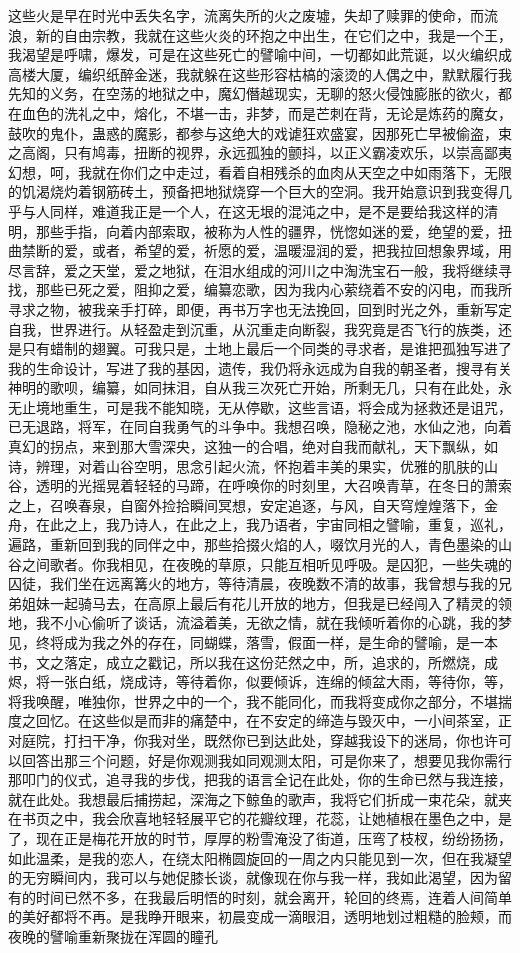 \documentclass[UTF8]{article}
\begin{document}
这些火是早在时光中丢失名字，流离失所的火之废墟，失却了赎罪的使命，而流浪，新的自由宗教，我就在这些火炎的环抱之中出生，在它们之中，我是一个王，我渴望是呼啸，爆发，可是在这些死亡的譬喻中间，一切都如此荒诞，以火编织成高楼大厦，编织纸醉金迷，我就躲在这些形容枯槁的滚烫的人偶之中，默默履行我先知的义务，在空荡的地狱之中，魔幻僭越现实，无聊的怒火侵蚀膨胀的欲火，都在血色的洗礼之中，熔化，不堪一击，非梦，而是芒刺在背，无论是炼药的魔女，鼓吹的鬼仆，蛊惑的魔影，都参与这绝大的戏谑狂欢盛宴，因那死亡早被偷盗，束之高阁，只有鸠毒，扭断的视界，永远孤独的颤抖，以正义霸凌欢乐，以崇高鄙夷幻想，呵，我就在你们之中走过，看着自相残杀的血肉从天空之中如雨落下，无限的饥渴烧灼着钢筋砖土，预备把地狱烧穿一个巨大的空洞。我开始意识到我变得几乎与人同样，难道我正是一个人，在这无垠的混沌之中，是不是要给我这样的清明，那些手指，向着内部索取，被称为人性的疆界，恍惚如迷的爱，绝望的爱，扭曲禁断的爱，或者，希望的爱，祈愿的爱，温暖湿润的爱，把我拉回想象界域，用尽言辞，爱之天堂，爱之地狱，在泪水组成的河川之中淘洗宝石一般，我将继续寻找，那些已死之爱，阻抑之爱，编纂恋歌，因为我内心萦绕着不安的闪电，而我所寻求之物，被我亲手打碎，即便，再书万字也无法挽回，回到时光之外，重新写定自我，世界进行。从轻盈走到沉重，从沉重走向断裂，我究竟是否飞行的族类，还是只有蜡制的翅翼。可我只是，土地上最后一个同类的寻求者，是谁把孤独写进了我的生命设计，写进了我的基因，遗传，我仍将永远成为自我的朝圣者，搜寻有关神明的歌呗，编纂，如同抹泪，自从我三次死亡开始，所剩无几，只有在此处，永无止境地重生，可是我不能知晓，无从停歇，这些言语，将会成为拯救还是诅咒，已无退路，将军，在同自我勇气的斗争中。我想召唤，隐秘之池，水仙之池，向着真幻的拐点，来到那大雪深央，这独一的合唱，绝对自我而献礼，天下飘纵，如诗，辨理，对着山谷空明，思念引起火流，怀抱着丰美的果实，优雅的肌肤的山谷，透明的光摇晃着轻轻的马蹄，在呼唤你的时刻里，大召唤青草，在冬日的萧索之上，召唤春泉，自窗外捡拾瞬间冥想，安定追逐，与风，自天穹煌煌落下，金舟，在此之上，我乃诗人，在此之上，我乃语者，宇宙同相之譬喻，重复，巡礼，遍路，重新回到我的同伴之中，那些拾掇火焰的人，啜饮月光的人，青色墨染的山谷之间歌者。你我相见，在夜晚的草原，只能互相听见呼吸。是囚犯，一些失魂的囚徒，我们坐在远离篝火的地方，等待清晨，夜晚数不清的故事，我曾想与我的兄弟姐妹一起骑马去，在高原上最后有花儿开放的地方，但我是已经闯入了精灵的领地，我不小心偷听了谈话，流溢着美，无欲之情，就在我倾听着你的心跳，我的梦见，终将成为我之外的存在，同蝴蝶，落雪，假面一样，是生命的譬喻，是一本书，文之落定，成立之戳记，所以我在这份茫然之中，所，追求的，所燃烧，成烬，将一张白纸，烧成诗，等待着你，似要倾诉，连绵的倾盆大雨，等待你，等，将我唤醒，唯独你，世界之中的一个，我不能同化，而我将变成你之部分，不堪揣度之回忆。在这些似是而非的痛楚中，在不安定的缔造与毁灭中，一小间茶室，正对庭院，打扫干净，你我对坐，既然你已到达此处，穿越我设下的迷局，你也许可以回答出那三个问题，好是你观测我如同观测太阳，可是你来了，想要见我你需行那叩门的仪式，追寻我的步伐，把我的语言全记在此处，你的生命已然与我连接，就在此处。我想最后捕捞起，深海之下鲸鱼的歌声，我将它们折成一束花朵，就夹在书页之中，我会欣喜地轻轻展平它的花瓣纹理，花蕊，让她植根在墨色之中，是了，现在正是梅花开放的时节，厚厚的粉雪淹没了街道，压弯了枝杈，纷纷扬扬，如此温柔，是我的恋人，在绕太阳椭圆旋回的一周之内只能见到一次，但在我凝望的无穷瞬间内，我可以与她促膝长谈，就像现在你与我一样，我如此渴望，因为留有的时间已然不多，在我最后明悟的时刻，就会离开，轮回的终焉，连着人间简单的美好都将不再。是我睁开眼来，初晨变成一滴眼泪，透明地划过粗糙的脸颊，而夜晚的譬喻重新聚拢在浑圆的瞳孔
\end{document}
